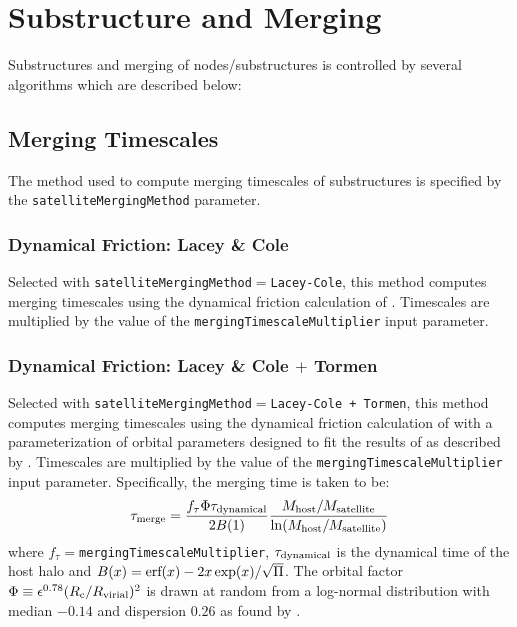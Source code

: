 \section{Substructure and Merging}

Substructures and merging of nodes/substructures is controlled by several algorithms which are described below:

\subsection{Merging Timescales}

The method used to compute merging timescales of substructures is specified by the {\tt satelliteMergingMethod} parameter.

\subsubsection{Dynamical Friction: Lacey \& Cole}

Selected with {\tt satelliteMergingMethod}$=${\tt Lacey-Cole}, this method computes merging timescales using the dynamical friction calculation of \cite{lacey_merger_1993}. Timescales are multiplied by the value of the {\tt mergingTimescaleMultiplier} input parameter.

\subsubsection{Dynamical Friction: Lacey \& Cole $+$ Tormen}

Selected with {\tt satelliteMergingMethod}$=${\tt Lacey-Cole + Tormen}, this method computes merging timescales using the dynamical friction calculation of \cite{lacey_merger_1993} with a parameterization of orbital parameters designed to fit the results of \cite{tormen_rise_1997} as described by \cite{cole_hierarchical_2000}. Timescales are multiplied by the value of the {\tt mergingTimescaleMultiplier} input parameter. Specifically, the merging time is taken to be:
\begin{equation}
 \tau_{\rm merge} = {f_\tau \Phi \tau_{\rm dynamical} \over 2 B(1)} { M_{\rm host}/M_{\rm satellite} \over \ln (M_{\rm host}/M_{\rm satellite})}
\end{equation}
where $f_\tau=${\tt mergingTimescaleMultiplier}, $\tau_{\rm dynamical}$ is the dynamical time of the host halo and $B(x)=\hbox{erf}(x)-2 x \exp(x)/\sqrt{\Pi}$. The orbital factor $\Phi \equiv \epsilon^{0.78} (R_{\rm c}/R_{\rm virial})^2$ is drawn at random from a log-normal distribution with median $-0.14$ and dispersion $0.26$ as found by \cite{cole_hierarchical_2000}.

